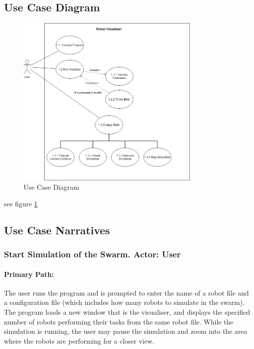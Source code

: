 \documentclass[11pt,a4paper]{article}
\begin{document}
\subsection{Use Case Diagram}

\begin{figure}[htpb]
\centering
\includegraphics[width=0.8\textwidth]{2}
\caption{Use Case Diagram}
\label{fig:use-case-diagram}
\end{figure}

see figure
\ref{fig:use-case-diagram}

\subsection{Use Case Narratives}
\subsubsection{Start Simulation of the Swarm. Actor: User}
\paragraph{Primary Path:} The user runs the program and is prompted to enter
the name of a robot file and a configuration file (which includes how many
robots to simulate in the swarm).  The program loads a new window that is the
visualiser, and displays the specified number of robots performing their tasks
from the same robot file.  While the simulation is running, the user may pause
the simulation and zoom into the area where the robots are performing for a
closer view.
\end{document}
